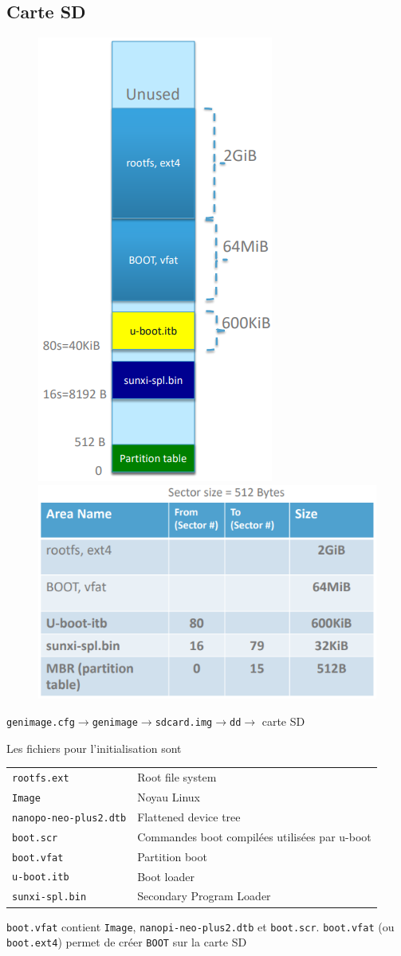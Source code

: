 \documentclass[resume]{subfiles}
\begin{document}
\subsection{Carte SD}
\begin{figure}[H]
\centering
\includegraphics[height=\columnwidth,angle=90]{img_2.png}\\
\includegraphics[width=0.5\columnwidth]{img_3.png}
\end{figure}
\begin{center}
\verb!genimage.cfg!$\longrightarrow$\verb!genimage!$\longrightarrow$\verb!sdcard.img!$\longrightarrow$\verb!dd!$\longrightarrow$ carte SD
\end{center}
Les fichiers pour l'initialisation sont\\
\begin{table}[H]
\begin{tabular}{lp{4cm}}
\verb!rootfs.ext! & Root file system\\
\verb!Image! & Noyau Linux\\
\verb!nanopo-neo-plus2.dtb! & Flattened device tree\\
\verb!boot.scr! & Commandes boot compilées utilisées par u-boot\\
\verb!boot.vfat! & Partition boot\\
\verb!u-boot.itb! & Boot loader\\
\verb!sunxi-spl.bin! & Secondary Program Loader
\end{tabular}
\end{table}
\verb!boot.vfat! contient \verb!Image!, \verb!nanopi-neo-plus2.dtb! et \verb!boot.scr!. \verb!boot.vfat! (ou \verb!boot.ext4!) permet de créer \verb!BOOT! sur la carte SD
\end{document}
